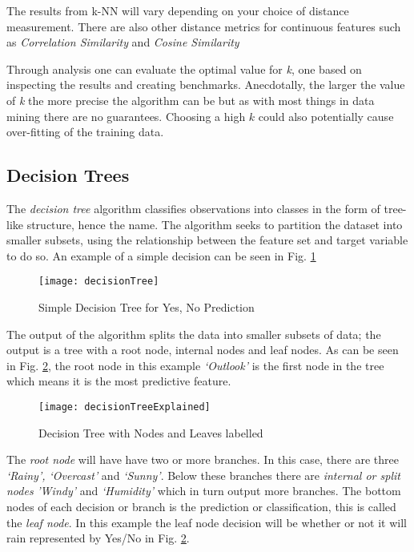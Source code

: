 The results from k-NN will vary depending on your choice of distance measurement. There are also other distance metrics for continuous features such as \textit{Correlation Similarity} and \textit{Cosine Similarity} \citep{sarwar_item-based_2001}

Through analysis one can evaluate the optimal value for \textit{k}, one based on inspecting the results and creating benchmarks. Anecdotally, the larger the value of \textit{k} the more precise the algorithm can be but as with most things in data mining there are no guarantees. Choosing a high $k$ could also potentially cause over-fitting of the training data.

\subsection{Decision Trees} \label{decTrees}
The \textit{decision tree} algorithm classifies observations into classes in the form of tree-like structure, hence the name. The algorithm seeks to partition the dataset into smaller subsets, using the relationship between the feature set and target variable to do so. An example of a simple decision can be seen in Fig. \ref{fig:decisionTree}

\begin{figure}[H]
	\texttt{[image: decisionTree]}
	\caption{Simple Decision Tree for Yes, No Prediction \\ \cite[Source:][]{quinlan_induction_1986}}
	\label{fig:decisionTree}
\end{figure}

The output of the algorithm splits the data into smaller subsets of data; the output is a tree with a root node, internal nodes and leaf nodes. As can be seen in Fig. \ref{fig:decisionTreeExplained}, the root node in this example \textit{`Outlook'} is the first node in the tree which means it is the most predictive feature. 

\begin{figure}[H]
	\texttt{[image: decisionTreeExplained]}
	\caption{Decision Tree with Nodes and Leaves labelled}
	\label{fig:decisionTreeExplained}
\end{figure}

The \textit{root node} will have have two or more branches. In this case, there are three \textit{`Rainy', `Overcast'} and \textit{`Sunny'}. Below these branches there are \textit{internal or split nodes} \textit{'Windy'} and \textit{`Humidity'} which in turn output more branches. The bottom nodes of each decision or branch is the prediction or classification, this is called the \textit{leaf node}. In this example the leaf node decision will be whether or not it will rain represented by Yes/No in Fig. \ref{fig:decisionTreeExplained}.

